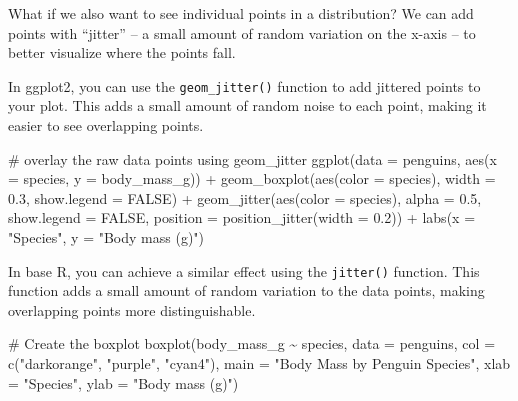 \documentclass[
  letterpaper,
  DIV=11,
  numbers=noendperiod]{scrreprt}
\newenvironment{Shaded}{\begin{snugshade}}{\end{snugshade}}
\newcommand{\AttributeTok}[1]{\textcolor[rgb]{0.40,0.45,0.13}{#1}}
\newcommand{\CommentTok}[1]{\textcolor[rgb]{0.37,0.37,0.37}{#1}}
\newcommand{\ConstantTok}[1]{\textcolor[rgb]{0.56,0.35,0.01}{#1}}
\newcommand{\FloatTok}[1]{\textcolor[rgb]{0.68,0.00,0.00}{#1}}
\newcommand{\FunctionTok}[1]{\textcolor[rgb]{0.28,0.35,0.67}{#1}}
\newcommand{\NormalTok}[1]{\textcolor[rgb]{0.00,0.23,0.31}{#1}}
\newcommand{\SpecialCharTok}[1]{\textcolor[rgb]{0.37,0.37,0.37}{#1}}
\newcommand{\StringTok}[1]{\textcolor[rgb]{0.13,0.47,0.30}{#1}}
\begin{document}
\begin{tcolorbox}[enhanced jigsaw, left=2mm, colframe=quarto-callout-tip-color-frame, leftrule=.75mm, opacitybacktitle=0.6, toptitle=1mm, title=\textcolor{quarto-callout-tip-color}{\faLightbulb}\hspace{0.5em}{Tip}, opacityback=0, coltitle=black, colbacktitle=quarto-callout-tip-color!10!white, breakable, colback=white, titlerule=0mm, bottomrule=.15mm, arc=.35mm, bottomtitle=1mm, rightrule=.15mm, toprule=.15mm]

What if we also want to see individual points in a distribution? We can
add points with ``jitter'' -- a small amount of random variation on the
x-axis -- to better visualize where the points fall.

In ggplot2, you can use the \texttt{geom\_jitter()} function to add
jittered points to your plot. This adds a small amount of random noise
to each point, making it easier to see overlapping points.

\begin{Shaded}
\begin{Highlighting}[]
\CommentTok{\# overlay the raw data points using geom\_jitter}
\FunctionTok{ggplot}\NormalTok{(}\AttributeTok{data =}\NormalTok{ penguins, }\FunctionTok{aes}\NormalTok{(}\AttributeTok{x =}\NormalTok{ species, }\AttributeTok{y =}\NormalTok{ body\_mass\_g)) }\SpecialCharTok{+}
  \FunctionTok{geom\_boxplot}\NormalTok{(}\FunctionTok{aes}\NormalTok{(}\AttributeTok{color =}\NormalTok{ species), }\AttributeTok{width =} \FloatTok{0.3}\NormalTok{, }\AttributeTok{show.legend =} \ConstantTok{FALSE}\NormalTok{) }\SpecialCharTok{+}
  \FunctionTok{geom\_jitter}\NormalTok{(}\FunctionTok{aes}\NormalTok{(}\AttributeTok{color =}\NormalTok{ species), }\AttributeTok{alpha =} \FloatTok{0.5}\NormalTok{, }\AttributeTok{show.legend =} \ConstantTok{FALSE}\NormalTok{, }
     \AttributeTok{position =} \FunctionTok{position\_jitter}\NormalTok{(}\AttributeTok{width =} \FloatTok{0.2}\NormalTok{)) }\SpecialCharTok{+}
  \FunctionTok{labs}\NormalTok{(}\AttributeTok{x =} \StringTok{"Species"}\NormalTok{,}
       \AttributeTok{y =} \StringTok{"Body mass (g)"}\NormalTok{)}
\end{Highlighting}
\end{Shaded}

In base R, you can achieve a similar effect using the \texttt{jitter()}
function. This function adds a small amount of random variation to the
data points, making overlapping points more distinguishable.

\begin{Shaded}
\begin{Highlighting}[]
\CommentTok{\# Create the boxplot}
\FunctionTok{boxplot}\NormalTok{(body\_mass\_g }\SpecialCharTok{\textasciitilde{}}\NormalTok{ species, }\AttributeTok{data =}\NormalTok{ penguins,}
        \AttributeTok{col =} \FunctionTok{c}\NormalTok{(}\StringTok{"darkorange"}\NormalTok{, }\StringTok{"purple"}\NormalTok{, }\StringTok{"cyan4"}\NormalTok{),}
        \AttributeTok{main =} \StringTok{"Body Mass by Penguin Species"}\NormalTok{,}
        \AttributeTok{xlab =} \StringTok{"Species"}\NormalTok{,}
        \AttributeTok{ylab =} \StringTok{"Body mass (g)"}\NormalTok{)}


\end{Highlighting}
\end{Shaded}
\end{tcolorbox}
\end{document}
